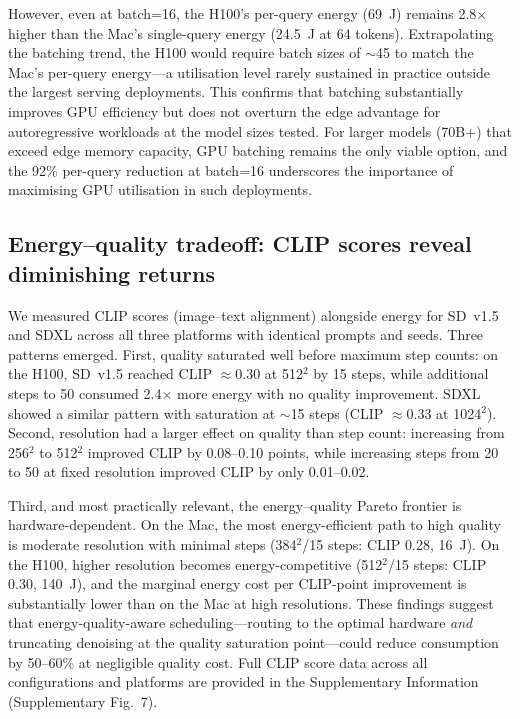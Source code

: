 \documentclass[preprint,12pt]{elsarticle}
\begin{document}
However, even at batch=16, the H100's per-query energy (69~J) remains 2.8$\times$ higher than the Mac's single-query energy (24.5~J at 64 tokens). Extrapolating the batching trend, the H100 would require batch sizes of $\sim$45 to match the Mac's per-query energy---a utilisation level rarely sustained in practice outside the largest serving deployments. This confirms that batching substantially improves GPU efficiency but does not overturn the edge advantage for autoregressive workloads at the model sizes tested. For larger models (70B+) that exceed edge memory capacity, GPU batching remains the only viable option, and the 92\% per-query reduction at batch=16 underscores the importance of maximising GPU utilisation in such deployments.

\subsection{Energy--quality tradeoff: CLIP scores reveal diminishing returns}

We measured CLIP scores (image--text alignment) alongside energy for SD~v1.5 and SDXL across all three platforms with identical prompts and seeds. Three patterns emerged. First, quality saturated well before maximum step counts: on the H100, SD~v1.5 reached CLIP $\approx$0.30 at 512$^2$ by 15 steps, while additional steps to 50 consumed 2.4$\times$ more energy with no quality improvement. SDXL showed a similar pattern with saturation at $\sim$15 steps (CLIP $\approx$0.33 at 1024$^2$). Second, resolution had a larger effect on quality than step count: increasing from 256$^2$ to 512$^2$ improved CLIP by 0.08--0.10 points, while increasing steps from 20 to 50 at fixed resolution improved CLIP by only 0.01--0.02.

Third, and most practically relevant, the energy--quality Pareto frontier is hardware-dependent. On the Mac, the most energy-efficient path to high quality is moderate resolution with minimal steps (384$^2$/15 steps: CLIP 0.28, 16~J). On the H100, higher resolution becomes energy-competitive (512$^2$/15 steps: CLIP 0.30, 140~J), and the marginal energy cost per CLIP-point improvement is substantially lower than on the Mac at high resolutions. These findings suggest that energy-quality-aware scheduling---routing to the optimal hardware \textit{and} truncating denoising at the quality saturation point---could reduce consumption by 50--60\% at negligible quality cost. Full CLIP score data across all configurations and platforms are provided in the Supplementary Information (Supplementary Fig.~7).
\end{document}
